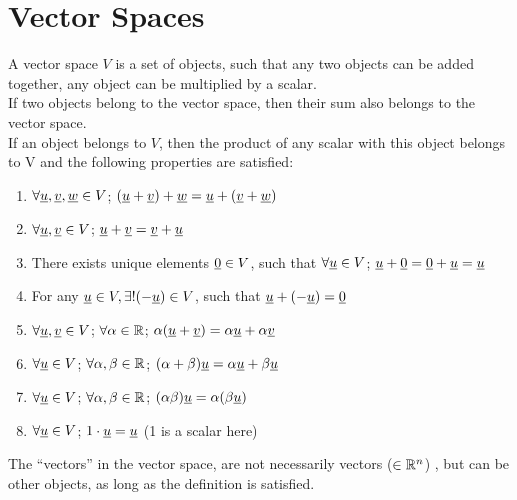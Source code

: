 \chapter{Vector Spaces}
\begin{definition}
A vector space $V$ is a set of objects, such that any two objects can be added together, any object can be multiplied by a scalar. \\

If two objects belong to the vector space, then their sum also belongs to the vector space. \\

If an object belongs to $V$, then the product of any scalar with this object belongs to V and the following properties are satisfied:
\begin{enumerate}
\item $\forall \underline{u},\underline{v},\underline{w}\in V$; $(\underline{u}+\underline{v})+\underline{w} = \underline{u}+(\underline{v}+\underline{w})$
\item $\forall \underline{u},\underline{v}\in V$; $\underline{u}+\underline{v} = \underline{v}+\underline{u}$
\item There exists unique elements $\underline{0}\in V$, such that $\forall\underline{u}\in V$; $\underline{u} + \underline{0} = \underline{0} + \underline{u} = \underline{u}$
\item For any $\underline{u}\in V, \exists!(-\underline{u})\in V$, such that $\underline{u}+(-\underline{u}) = \underline{0}$
\item $\forall \underline{u},\underline{v}\in V$; $\forall \alpha\in\mathbb{R}$; $\alpha(\underline{u}+\underline{v}) = \alpha\underline{u} + \alpha\underline{v}$
\item $\forall \underline{u}\in V$; $\forall \alpha,\beta\in\mathbb{R}$; $(\alpha+\beta)\underline{u} = \alpha\underline{u} + \beta\underline{u}$
\item $\forall \underline{u}\in V$; $\forall \alpha,\beta\in\mathbb{R}$; $(\alpha\beta)\underline{u} = \alpha(\beta\underline{u})$
\item $\forall \underline{u}\in V$; $1\cdot \underline{u} = \underline{u}$ (1 is a scalar here)
\end{enumerate}
\end{definition}
\begin{remark}
The ``vectors'' in the vector space, are not necessarily vectors ($\in\mathbb{R}^n$)	, but can be other objects, as long as the definition is satisfied.
\end{remark}

